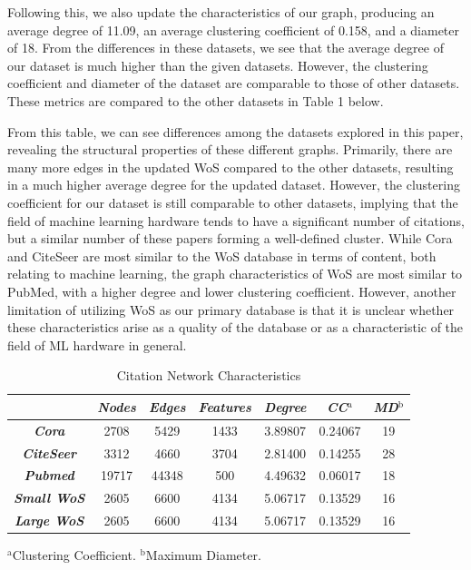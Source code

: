 \documentclass[conference]{IEEEtran}
\begin{document}
Following this, we also update the characteristics of our graph, producing an average 
degree of 11.09, an average clustering coefficient of 0.158, and a diameter of 18. 
From the differences in these datasets, we see that the average degree of our dataset 
is much higher than the given datasets. However, the clustering coefficient and diameter 
of the dataset are comparable to those of other datasets. These metrics are compared to 
the other datasets in Table 1 below. \par 

From this table, we can see differences among the datasets explored in this paper, 
revealing the structural properties of these different graphs. Primarily, there are 
many more edges in the updated WoS compared to the other datasets, resulting in a much 
higher average degree for the updated dataset. However, the clustering coefficient for 
our dataset is still comparable to other datasets, implying that the field of machine 
learning hardware tends to have a significant number of citations, but a similar number 
of these papers forming a well-defined cluster. While Cora and CiteSeer are most similar 
to the WoS database in terms of content, both relating to machine learning, the graph 
characteristics of WoS are most similar to PubMed, with a higher degree and lower 
clustering coefficient. However, another limitation of utilizing WoS as our primary 
database is that it is unclear whether these characteristics arise as a quality of 
the database or as a characteristic of the field of ML hardware in general. \par

\begin{table}[htbp]
    \caption{Citation Network Characteristics}
    \begin{center}
        \begin{tabular}{|c|cccccc|}
        \hline
        \textbf{} & \textbf{\textit{Nodes}} & \textbf{\textit{Edges}} & \textbf{\textit{Features}} &
        \textbf{\textit{Degree}} & \textbf{\textit{CC$^{\mathrm{a}}$}} & \textbf{\textit{MD$^{\mathrm{b}}$}} \\
        \hline
        \textbf{\textit{Cora}} & 
        2708& 5429& 1433& 3.89807& 0.24067& 19 \\
        \textbf{\textit{CiteSeer}} & 
        3312& 4660& 3704& 2.81400& 0.14255& 28 \\
        \textbf{\textit{Pubmed}} & 
        19717& 44348& 500& 4.49632& 0.06017& 18 \\
        \textbf{\textit{Small WoS}} & 
        2605& 6600& 4134& 5.06717& 0.13529& 16 \\
        \textbf{\textit{Large WoS}} & 
        2605& 6600& 4134& 5.06717& 0.13529& 16 \\
        \hline
        \end{tabular}
        \label{tab1}
        {$^{\mathrm{a}}$Clustering Coefficient.}
        {$^{\mathrm{b}}$Maximum Diameter.}
    \end{center}
\end{table}
\end{document}
